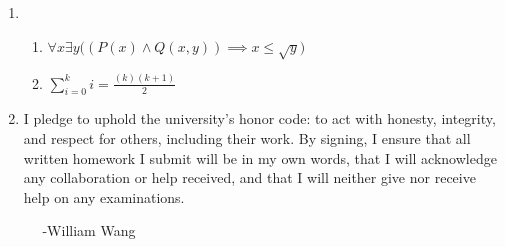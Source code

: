 \documentclass[a4paper]{article}
\newcommand{\<}{\langle}
\renewcommand{\>}{\rangle}
\renewcommand{\^}{\wedge}
\begin{document}
\begin{enumerate}
\begin{enumerate}
        \end{enumerate}
    \item
        \begin{enumerate}
            \item $\forall x \exists y \big((P(x) \^ Q(x,y)) \implies x \leq \sqrt{y}\big)$
            \item $\displaystyle \sum_{i=0}^{k}i = \frac{(k)(k+1)}{2}$
        \end{enumerate}
    \item I pledge to uphold the university’s honor code: to act with honesty, integrity, and respect for others, including their work. By signing, I ensure that all written homework I submit will be in my own words, that I will acknowledge any collaboration or help received, and that I will neither give nor receive help on any examinations.
    
    $\quad$ -William Wang
\end{enumerate}
\end{document}
